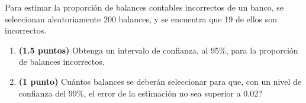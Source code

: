 
Para estimar la proporción de balances contables incorrectos de un banco, se seleccionan aleatoriamente 200 balances, y se encuentra que 19 de ellos son incorrectos.
\begin{enumerate}[label=\alph*)]
\item \textbf{(1.5 puntos)} Obtenga un intervalo de confianza, al 95\%, para la proporción de balances incorrectos.
\item \textbf{(1 punto)} \textquestiondown{}Cuántos balances se deberán seleccionar para que, con un nivel de confianza del 99\%, el error de la estimación no sea superior a 0.02?
\end{enumerate}
